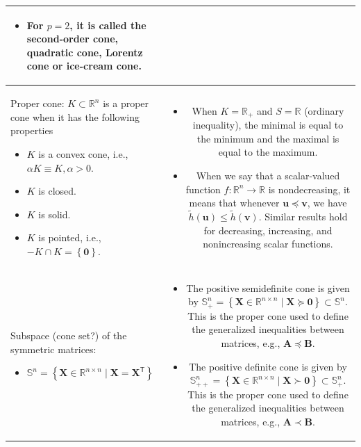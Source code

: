 \documentclass{article}
\begin{document}
\begin{xltabular}{\textwidth}{|A|C|}
\begin{itemize}[leftmargin=*]
    \item For \(p=2\), it is called the second-order cone, quadratic cone,  Lorentz cone or ice-cream cone.
\end{itemize} \\
\hline
Proper cone: \(K \subset \mathbb{R}^{n}\) is a proper cone when it has the following properties
\begin{itemize}
    \item \(K\) is a convex cone, i.e., \(\alpha K \equiv K, \alpha > 0\).
    \item \(K\) is closed.
    \item \(K\) is solid.
    \item \(K\) is pointed, i.e., \(-K \cap K = \left\{ \mathbf{0} \right\}\).
\end{itemize} & \vspace{-3.5ex} \begin{itemize}[leftmargin=*]
    \item When \(K = \mathbb{R}_{+}\) and \(S = \mathbb{R}\) (ordinary inequality), the minimal is equal to the minimum and the maximal is equal to the maximum.
    \item When we say that a scalar-valued function \(f: \mathbb{R}^{n} \rightarrow \mathbb{R}\) is nondecreasing, it means that whenever \(\mathbf{u}\preceq \mathbf{v}\), we have \(\tilde{h}(\mathbf{u})\leq \tilde{h}(\mathbf{v})\). Similar results hold for decreasing, increasing, and nonincreasing scalar functions.
\end{itemize} \\
\hline
Subspace (cone set?) of the symmetric matrices:
\begin{itemize}
    \item \(\mathbb{S}^n = \left\{ \mathbf{X} \in \mathbb{R}^{n\times n} \mid \mathbf{X} = \mathbf{X}^\mathsf{T}\right\}\)
\end{itemize} & \vspace{-3.5ex} \begin{itemize}[leftmargin=*]
    \item The positive semidefinite cone is given by \(\mathbb{S}^n_+ = \left\{ \mathbf{X} \in \mathbb{R}^{n\times n} \mid \mathbf{X} \succeq \mathbf{0} \right\} \subset \mathbb{S}^n\). This is the proper cone used to define the generalized inequalities between matrices, e.g., \(\mathbf{A} \preceq \mathbf{B}\).
    \item The positive definite cone is given by \(\mathbb{S}^n_{++} = \left\{ \mathbf{X} \in \mathbb{R}^{n\times n} \mid \mathbf{X} \succ \mathbf{0} \right\}\subset \mathbb{S}^n_+ \). This is the proper cone used to define the generalized inequalities between matrices, e.g., \(\mathbf{A} \prec \mathbf{B}\).

\end{itemize}
\end{xltabular}
\end{document}
